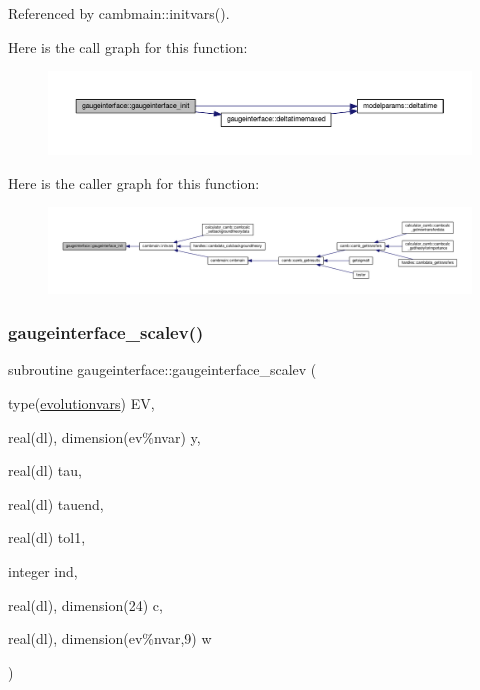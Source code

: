 Referenced by cambmain\+::initvars().

Here is the call graph for this function\+:
\nopagebreak
\begin{figure}[H]
\begin{center}
\leavevmode
\includegraphics[width=350pt]{namespacegaugeinterface_a59182efb978c657918dd88675b2ab0ef_cgraph}
\end{center}
\end{figure}
Here is the caller graph for this function\+:
\nopagebreak
\begin{figure}[H]
\begin{center}
\leavevmode
\includegraphics[width=350pt]{namespacegaugeinterface_a59182efb978c657918dd88675b2ab0ef_icgraph}
\end{center}
\end{figure}
\mbox{\label{namespacegaugeinterface_ac02938234bdca8dcd23649b1abb34ab3}} 
\subsubsection{\texorpdfstring{gaugeinterface\+\_\+scalev()}{gaugeinterface\_scalev()}}
{\footnotesize\ttfamily subroutine gaugeinterface\+::gaugeinterface\+\_\+scalev (\begin{DoxyParamCaption}\item[{type(\mbox{\hyperlink{structgaugeinterface_1_1evolutionvars}{evolutionvars}})}]{EV,  }\item[{real(dl), dimension(ev\%nvar)}]{y,  }\item[{real(dl)}]{tau,  }\item[{real(dl)}]{tauend,  }\item[{real(dl)}]{tol1,  }\item[{integer}]{ind,  }\item[{real(dl), dimension(24)}]{c,  }\item[{real(dl), dimension(ev\%nvar,9)}]{w }\end{DoxyParamCaption})}




